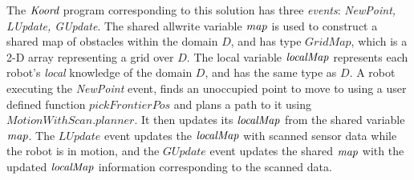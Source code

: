  The $\emph{Koord}$ program corresponding to this solution has three \emph{events}: \emph{NewPoint, LUpdate, GUpdate}. The shared allwrite variable $\mathit{map}$ is used to construct a shared map of obstacles within the domain $D$, and has type $\mathit{GridMap}$, which is a 2-D array representing a grid over $D$. The local variable $\mathit{localMap}$ represents each robot's \emph{local} knowledge of the domain $D$, and has the same type as $D$. A robot executing the \emph{NewPoint} event, finds an unoccupied point to move to using a user defined function $\mathit{pickFrontierPos}$ and plans a path to it using $\mathit{MotionWithScan.planner}$. It then updates its $\mathit{localMap}$ from the shared variable $\mathit{map}$. The $\mathit{LUpdate}$ event updates the $\mathit{localMap}$ with scanned sensor data while the robot is in motion, and the $\mathit{GUpdate}$ event updates the shared $\mathit{map}$ with the updated $\mathit{localMap}$ information corresponding to the scanned data.




